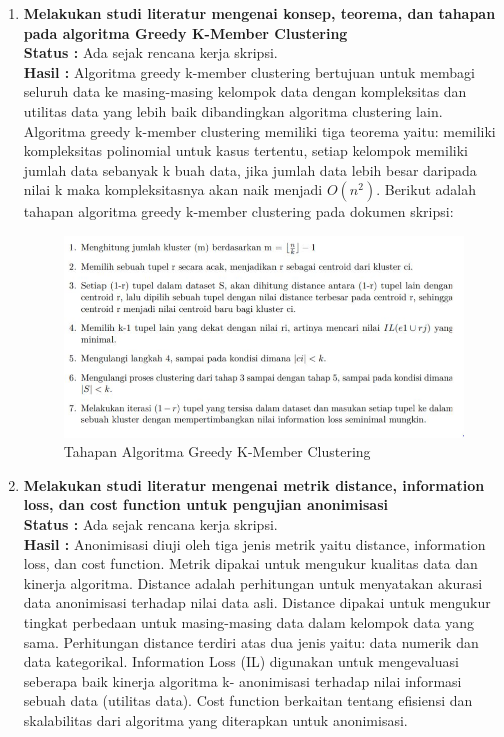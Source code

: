 \documentclass[a4paper,twoside]{article}
\begin{document}
\begin{enumerate}
\newpage
		\item \textbf{Melakukan studi literatur mengenai konsep, teorema, dan tahapan pada algoritma Greedy K-Member Clustering}\\
		{\bf Status :} Ada sejak rencana kerja skripsi.\\
		{\bf Hasil :} Algoritma greedy k-member clustering bertujuan untuk membagi seluruh data ke masing-masing kelompok data dengan kompleksitas dan utilitas data yang lebih baik dibandingkan algoritma clustering lain. Algoritma greedy k-member clustering memiliki tiga teorema yaitu: memiliki kompleksitas polinomial untuk kasus tertentu, setiap kelompok memiliki jumlah data sebanyak k buah data, jika jumlah data lebih besar daripada nilai k maka kompleksitasnya akan naik menjadi $O(n^2)$. Berikut adalah tahapan algoritma greedy k-member clustering pada dokumen skripsi:
		
\begin{figure}[H]
	\centering
	\includegraphics[scale=0.8]{algoritma}
	\caption{Tahapan Algoritma Greedy K-Member Clustering}
	\label{fig:algoritma}
\end{figure}

\item \textbf{Melakukan studi literatur mengenai metrik distance, information loss, dan cost function untuk pengujian anonimisasi}\\
		{\bf Status :} Ada sejak rencana kerja skripsi.\\
		{\bf Hasil :}  Anonimisasi diuji oleh tiga jenis metrik yaitu distance, information loss, dan cost function. Metrik dipakai
untuk mengukur kualitas data dan kinerja algoritma. Distance adalah  perhitungan untuk menyatakan akurasi data anonimisasi terhadap nilai data asli. Distance dipakai untuk mengukur tingkat perbedaan untuk masing-masing data dalam kelompok data yang sama. Perhitungan distance terdiri atas dua jenis yaitu: data numerik dan data kategorikal. Information Loss (IL) digunakan untuk mengevaluasi seberapa baik kinerja algoritma k- anonimisasi
terhadap nilai informasi sebuah data (utilitas data). Cost function berkaitan tentang efisiensi dan skalabilitas dari algoritma yang diterapkan untuk anonimisasi.


\end{enumerate}
\end{document}
